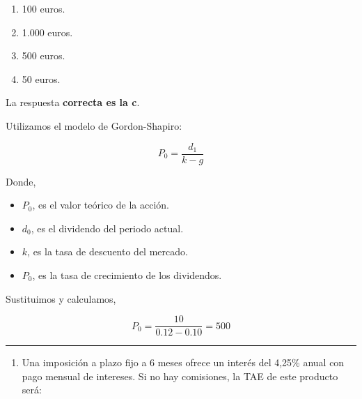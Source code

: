 \documentclass[
  letterpaper,
  DIV=11,
  numbers=noendperiod]{scrreprt}
\providecommand{\tightlist}{%
  \setlength{\itemsep}{0pt}\setlength{\parskip}{0pt}}\usepackage{longtable,booktabs,array}
\begin{document}
\begin{enumerate}
\def\labelenumi{\alph{enumi}.}
\item
  100 euros.
\item
  1.000 euros.
\item
  500 euros.
\item
  50 euros.
\end{enumerate}

\begin{tcolorbox}[enhanced jigsaw, left=2mm, opacityback=0, colback=white, breakable, arc=.35mm, bottomrule=.15mm, rightrule=.15mm, toprule=.15mm, leftrule=.75mm, colframe=quarto-callout-tip-color-frame]
\begin{minipage}[t]{5.5mm}
\textcolor{quarto-callout-tip-color}{\faLightbulb}
\end{minipage}%
\begin{minipage}[t]{\textwidth - 5.5mm}

La respuesta \textbf{correcta es la c}.

Utilizamos el modelo de Gordon-Shapiro:

\[P_0=\frac{d_1}{k-g}\]

Donde,

\begin{itemize}
\item
  \(P_0\), es el valor teórico de la acción.
\item
  \(d_0\), es el dividendo del periodo actual.
\item
  \(k\), es la tasa de descuento del mercado.
\item
  \(P_0\), es la tasa de crecimiento de los dividendos.
\end{itemize}

Sustituimos y calculamos,

\[P_0=\frac{10}{0.12-0.10}=500\]

\end{minipage}%
\end{tcolorbox}

\begin{center}\rule{0.5\linewidth}{0.5pt}\end{center}

\begin{enumerate}
\def\labelenumi{\arabic{enumi}.}
\setcounter{enumi}{51}
\tightlist
\item
  Una imposición a plazo fijo a 6 meses ofrece un interés del 4,25\%
  anual con pago mensual de intereses. Si no hay comisiones, la TAE de
  este producto será:
\end{enumerate}
\end{document}
